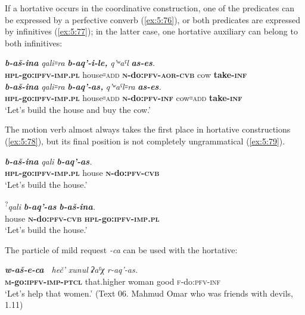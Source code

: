 ﻿\documentclass[output=paper]{langsci/langscibook}
\begin{document}
If a hortative occurs in the coordinative construction, one of the
predicates can be expressed by a perfective converb (\ref{ex:5:76}), or both
predicates are expressed by infinitives (\ref{ex:5:77}); in the latter case, one
hortative auxiliary can belong to both infinitives:

\ea \label{ex:5:76} %
\gll \emph{\textbf{b-aš-ina}} \emph{qali꞊ra } \emph{\textbf{b-aq'-i-le,}} \emph{q'ʷaˤl} \emph{\textbf{as-es}.}\\
\textbf{\textsc{hpl}-go:\textsc{ipfv}-\textsc{imp}.\textsc{pl}} house꞊\textsc{add} \textbf{\textsc{n}-do:\textsc{pfv}-\textsc{aor}-\textsc{cvb}} cow \textbf{take-\textsc{inf}}\\

\ex \label{ex:5:77} %
\gll \emph{\textbf{b-aš-ina}} \emph{qali꞊ra } \emph{\textbf{b-aq'-as,}} \emph{q'ʷaˤl꞊ra} \emph{\textbf{as-es}.}\\
 \textbf{\textsc{hpl}-go:\textsc{ipfv}-\textsc{imp}.\textsc{pl}} house꞊\textsc{add} \textbf{\textsc{n}-do:\textsc{pfv}-\textsc{inf}} cow꞊\textsc{add} \textbf{take-\textsc{inf}}\\
\glt `Let's build the house and buy the cow.'
\z

The motion verb almost always takes the first place in hortative
constructions (\ref{ex:5:78}), but its final position is not completely
ungrammatical (\ref{ex:5:79}).

\ea \label{ex:5:78} %
\gll \emph{\textbf{b-aš-ina}} \emph{qali} \emph{\textbf{b-aq'-as}.}\\
\textbf{\textsc{hpl}-go:\textsc{ipfv}-\textsc{imp}.\textsc{pl}} house \textbf{\textsc{n}-do:\textsc{pfv}-\textsc{cvb}}\\
\glt `Let's build the house.'

\ex \label{ex:5:79} %
\gll \textsuperscript{?}\emph{qali} \emph{\textbf{b-aq'-as}} \emph{\textbf{b-aš-ina}.} \\
house \textbf{\textsc{n}-do:\textsc{pfv}-\textsc{cvb}} \textbf{\textsc{hpl}-go:\textsc{ipfv}-\textsc{imp}.\textsc{pl}}\\
\glt `Let's build the house.'
\z

The particle of mild request \emph{-ca} can be used with the hortative:

\ea %
\gll \emph{\textbf{w-aš-e-ca~}} \emph{heč'} \emph{xunul} \emph{ʡaˤχ} \emph{r-aq'-as.}\\
\textbf{\textsc{m}-go:\textsc{ipfv}-\textsc{imp}-\textsc{ptcl}} that.higher woman good \textsc{f}-do:\textsc{pfv}-\textsc{inf}\\
\glt `Let's help that women.' (Text 06. Mahmud Omar who was friends with
devils, 1.11)
\z
\end{document}
